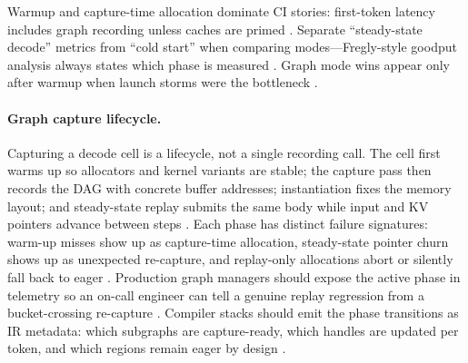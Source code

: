 Warmup and capture-time allocation dominate CI stories: first-token latency includes graph recording unless caches are primed \citep{nvidia2024cudagraphs,kwon2023vllm,patel2025llminference,memoryfloor2026}. Separate ``steady-state decode'' metrics from ``cold start'' when comparing modes---Fregly-style goodput analysis always states which phase is measured \citep{patel2025llminference,taxbreak2026,dlbook,yirage2026,chen2020compilerbasedhardw,amd2024xdna,amd2024aie,semianalysis2024tma,dao2022flashattention,liu2024deepseekv3,dao2023flashdecoding,nvidia2022hopper,taxbreak2026,memoryfloor2026,nvidia2024cudagraphs,kwon2023vllm}. Graph mode wins appear only after warmup when launch storms were the bottleneck \citep{memoryfloor2026,nvidia2024cudagraphs,taxbreak2026,yirage2026,chen2020compilerbasedhardw,patel2025llminference,amd2024xdna,dlbook,dao2022flashattention,amd2024aie,semianalysis2024tma,liu2024deepseekv3,dao2023flashdecoding,nvidia2022hopper,kwon2023vllm}.

\paragraph{Graph capture lifecycle.}
Capturing a decode cell is a lifecycle, not a single recording call. The cell first warms up so allocators and kernel variants are stable; the capture pass then records the DAG with concrete buffer addresses; instantiation fixes the memory layout; and steady-state replay submits the same body while input and KV pointers advance between steps \citep{nvidia2024cudagraphs,kwon2023vllm}. Each phase has distinct failure signatures: warm-up misses show up as capture-time allocation, steady-state pointer churn shows up as unexpected re-capture, and replay-only allocations abort or silently fall back to eager \citep{memoryfloor2026,patel2025llminference}. Production graph managers should expose the active phase in telemetry so an on-call engineer can tell a genuine replay regression from a bucket-crossing re-capture \citep{yirage2026,chen2020compilerbasedhardw}. Compiler stacks should emit the phase transitions as IR metadata: which subgraphs are capture-ready, which handles are updated per token, and which regions remain eager by design \citep{taxbreak2026,nvidia2024cudagraphs}.


